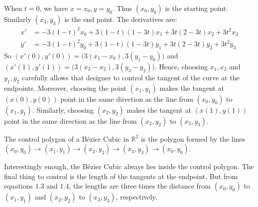 \documentclass[crop=false,class=book,oneside]{standalone}
\begin{document}
                When $t=0$, we have $x = x_0, y=y_0$.
                Thus $(x_0,y_0)$ is the starting point.
                Similarly $(x_3,y_3)$ is the end point.
                The derivatives are:
                \begin{align*}
                    x'&=-3(1-t)^2x_0
                       +3(1-t)(1-3t)x_1
                       +3t(2-3t)x_2
                       +3t^2x_3 \\
                    y'&=-3(1-t)^2y_0
                       +3(1-t)(1-3t)y_1
                       +3t(2-3t)y_2
                       +3t^2y_3
                \end{align*}
                So $(x'(0),y'(0))=\big(3(x_1-x_0),3(y_1-y_0)\big)$
                and $(x'(1),y'(1))=\big(3(x_3-x_2),3(y_3-y_2)\big)$.
                Hence, choosing $x_1,x_2$ and $y_1,y_2$ carefully
                allows that designer to control the tangent of the
                curve at the endpoints. Moreover, choosing the point
                $(x_1,y_1)$ makes the tangent at $(x(0),y(0))$ point
                in the same direction as the line from $(x_0,y_0)$
                to $(x_1,y_1)$. Similarly, choosing $(x_2,y_2)$ makes
                the tangent at $(x(1),y(1))$ point in the same
                direction as the line from
                $(x_2,y_2)$ to $(x_3,y_3)$.
                \begin{definition}
                    The control polygon of a B\'{e}zier Cubic
                    in $\mathbb{R}^2$ is the polygon formed
                    by the lines
                    $(x_0,y_0)\rightarrow(x_1,y_1)%
                     \rightarrow(x_2,y_2)\rightarrow(x_3,y_3)%
                     \rightarrow (x_0,y_0)$.
                \end{definition}
                Interestingly enough, the B\'{e}zier Cubic always
                lies inside the control polygon. The final thing
                to control is the length of the tangents at the
                endpoint. But from equations $1.3$ and $1.4$, the
                lengths are three times the distance from
                $(x_0,y_0)$ to $(x_1,y_1)$ and $(x_2,y_2)$ to
                $(x_3,y_3)$, respectively. 
\end{document}

